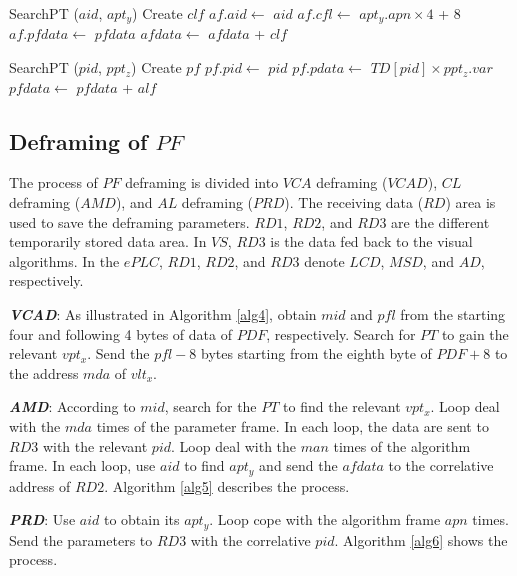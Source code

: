 \documentclass[journal,UTF8]{IEEEtran}
\begin{document}
	\begin{algorithm}
		\label{alg2}
		\caption{$AMF$}%
		SearchPT ($aid$, $apt_y$)\;
		Create $clf$\;
		$af.aid\leftarrow$ $aid$\;
		$af.cfl \leftarrow$ $apt_y.apn \times 4$ + 8\;
		$af.pfdata \leftarrow$ $pfdata$\;	
		$afdata\leftarrow$ $afdata$ + $clf$\;	 
	\end{algorithm}
	\begin{algorithm}
		\label{alg3}
		\caption{$PRF$}%
		\KwOut{$pfdata$}%
		SearchPT ($pid$, $ppt_z$)\;
		Create $pf$\;
		$pf.pid\leftarrow$ $pid$\; %
		$pf.pdata \leftarrow$ $TD[pid]\times ppt_z.var$\;
		$pfdata\leftarrow$ $pfdata$ + $alf$\;	 
	\end{algorithm}
	
	\subsection{Deframing of $PF$}
	The process of $PF$ deframing is divided into $VCA$ deframing ($VCAD$), $CL$ deframing ($AMD$), and $AL$ deframing ($PRD$). The receiving data ($RD$) area is used to save the deframing parameters. $RD1$, $RD2$, and $RD3$ are the different temporarily stored data area. In $VS$, $RD3$ is the data fed back to the visual algorithms. In the $ePLC$, $RD1$, $RD2$, and $RD3$ denote $LCD$, $MSD$, and $AD$, respectively.
	
	\textbf{\emph{VCAD}}: As illustrated in Algorithm \ref{alg4}, obtain $mid$ and $pfl$ from the starting four and following 4 bytes of data of $PDF$, respectively. Search for $PT$ to gain the relevant $vpt_x$. Send the $pfl-8$ bytes starting from the eighth byte of $PDF+8$ to the address $mda$ of $vlt_x$.
	
	\textbf{\emph{AMD}}: According to $mid$, search for the $PT$ to find the relevant $vpt_x$. Loop deal with the $mda$ times of the parameter frame. In each loop, the data are sent to $RD3$ with the relevant $pid$. Loop deal with the $man$ times of the algorithm frame. In each loop, use $aid$ to find $apt_y$ and send the $afdata$ to the correlative address of $RD2$. Algorithm \ref{alg5} describes the process.
	
	\textbf{\emph{PRD}}: Use $aid$ to obtain its $apt_y$. Loop cope with the algorithm frame $apn$ times. Send the parameters to $RD3$ with the correlative $pid$. Algorithm \ref{alg6} shows the process.
	
\end{document}

